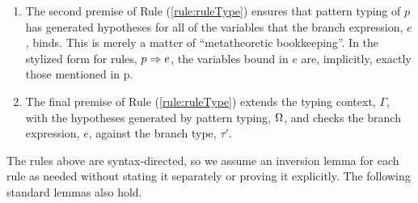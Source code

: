 {{{{\begin{enumerate}
Rule (\ref{rule:patType-var}) specifies that a variable pattern, $x$, can match values of any type, $\tau$, and generates the hypothesis that $x$ has the type $\tau$. 

Rule (\ref{rule:patType-wild}) specifies that a wildcard pattern can also match values of any type, $\tau$, but wildcard patterns generate no hypotheses. 

Labeled tuple patterns, $\aetplp{\labelset}{\mapschema{p}{i}{\labelset}}$, specify a subpattern $p_i$ for each label $i \in \labelset$. Rule (\ref{rule:patType-tpl}) specifies that a labeled tuple pattern of this form matches values of the labeled product type $\aprod{\labelset}{\mapschema{\tau}{i}{\labelset}}$. The first premise checks each subpattern $p_i$ against the corresponding type $\tau_i$, generating hypotheses $\pctx_i$. The second premise ensures that no variables are multiply bound by checking that the domains of the generated pattern typing contexts $\pctx_i$ are mutually disjoint. The hypotheses generated in the conclusion of the rule are the union of the hypotheses generated by the subpatterns. 

Injection patterns, $\aeinjp{\ell}{p}$, match values of labeled sum types of the form $\asum{\labelset, \ell}{\mapschema{\tau}{i}{\labelset}; \mapitem{\ell}{\tau}}$, i.e. labeled sum types that define a case for the label $\ell$. Rule (\ref{rule:patType-inj}) checks the subpattern $p$ against the corresponding type $\tau$, and passes through the assumptions that $p$ generates.

\item The second premise of Rule (\ref{rule:ruleType}) ensures that pattern typing of $p$ has generated hypotheses for all of the variables that the branch expression, $e$, binds. This is merely a matter of ``metatheoretic bookkeeping''. In the stylized form for rules, $p \Rightarrow e$, the variables bound in $e$ are, implicitly, exactly those mentioned in p.%
\item The final premise of Rule (\ref{rule:ruleType}) extends the typing context, $\Gamma$, with the hypotheses generated by pattern typing, $\Omega$, and checks the branch expression, $e$, against the branch type, $\tau'$.
\end{enumerate}

The rules above are syntax-directed, so we assume an inversion lemma for each rule as needed without stating it separately or proving it explicitly. The following standard lemmas also hold.

}}}}
